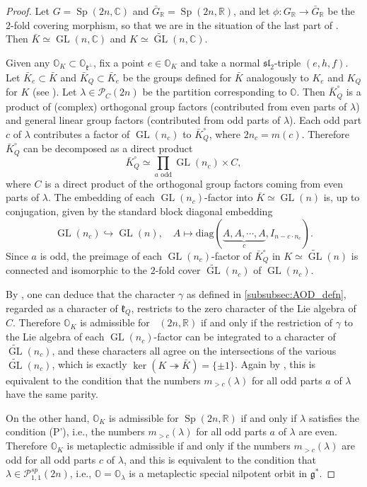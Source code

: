 \documentclass[11pt, a4paper]{amsart}
\newcommand{\C}{\mathbb{C}}
\newcommand{\orb}{\mathbb{O}}
\newcommand{\orbk}{\orb_{K}}
\newcommand{\fg}{\mathfrak{g}}
\newcommand{\fk}{\mathfrak{k}}
\newcommand{\cP}{\mathcal{P}}
\DeclareMathOperator{\Mp}{\widetilde{Sp}}
\newcommand{\Sp}{\operatorname{Sp}}
\newcommand{\R}{\mathbb{R}}
\newcommand{\GR}{G_\R}
\newcommand{\slf}{\mathfrak{sl}}
\newcommand{\GL}{\operatorname{GL}}
\theoremstyle{definition}
\numberwithin{equation}{section}
\begin{document}
\begin{proof}
    Let $G = \Sp(2n, \C)$ and $\bar{G}_\R = \Sp(2n,\R)$,
	and let $\phi: \GR \to \bar{G}_\R$ be the $2$-fold covering morphism, so that we are in the situation of the last part of . Then $\bar{K} \simeq \GL(n,\C)$ and $K \simeq \widetilde{\GL}(n, \C)$.

    Given any $\orbk \subset \orb_{\fk^\perp}$, fix a point $e \in \orbk$ and take a normal $\slf_2$-triple $(e, h, f)$. Let $\bar{K}_e \subset \bar{K}$ and $\bar{K}_Q \subset \bar{K}_e$ be the groups defined for $\bar{K}$ analogously to $K_e$ and $K_Q$ for $K$ (see ). 
    Let $\lambda \in \cP_C(2n)$ be the partition corresponding to $\orb$. 
	Then $\bar{K}_Q^\circ$ is a product of (complex) orthogonal group factors (contributed from even parts of $\lambda$) and general linear group factors (contributed from odd parts of $\lambda$). Each odd part $c$ of $\lambda$ contributes a factor of $\GL(n_c)$ to $\bar{K}_Q^\circ$, where $2n_c = m(c)$. Therefore $\bar{K}_Q^\circ$ can be decomposed as a direct product
    \[ 
        \bar{K}_Q^\circ \simeq \prod_{a \text{ odd}} \GL(n_c) \times C,
    \]
    where $C$ is a direct product of the orthogonal group factors coming from even parts of $\lambda$.
    The embedding of each $\GL(n_c)$-factor into $\bar{K} \simeq \GL(n)$ is, up to conjugation, given by the standard block diagonal embedding 
		\[ \GL(n_c) \hookrightarrow \GL(n), \quad A \mapsto \mathrm{diag}(\underbrace{A, A, \cdots, A}_{c}, I_{n - c \cdot n_c}). \] 
	Since $a$ is odd, the preimage of each $\GL(n_c)$-factor of $\bar{K}_Q^\circ$ in $K \simeq \widetilde{\GL}(n)$ is connected and isomorphic to the $2$-fold cover $\widetilde{\GL}(n_c)$ of $\GL(n_c)$. 
    
    By \cite[Lemma 7]{Ohta:Adm}, one can deduce that the character $\gamma$ as defined in \cref{subsubsec:AOD_defn}, regarded as a character of $\fk_Q$, restricts to the zero character of the Lie algebra of $C$. Therefore $\orbk$ is admissible for $\Mp(2n,\R)$ if and only if the restriction of $\gamma$ to the Lie algebra of each $\GL(n_c)$-factor can be integrated to a character of $\widetilde{\GL}(n_c)$, and these characters all agree on the intersections of the various $\widetilde{\GL}(n_c)$, which is exactly $\ker(K \twoheadrightarrow \bar{K}) = \{\pm 1\}$. 
    Again by \cite[Lemma 7]{Ohta:Adm}, this is equivalent to the condition that the numbers $m_{>c}(\lambda)$ for all odd parts $a$ of $\lambda$ have the same parity. 
	
	On the other hand, $\orbk$ is admissible for $\Sp(2n,\R)$ if and only if $\lambda$ satisfies the condition (P'), i.e., the numbers $m_{>c}(\lambda)$ for all odd parts $a$ of $\lambda$ are even. Therefore $\orbk$ is metaplectic admissible if and only if the numbers $m_{>c}(\lambda)$ are odd for all odd parts $c$ of $\lambda$, and this is equivalent to the condition that $\lambda \in \cP_{1,1}^{sp}(2n)$, i.e., $\orb = \orb_\lambda$ is a metaplectic special nilpotent orbit in $\fg^*$.
\end{proof}
\end{document}
